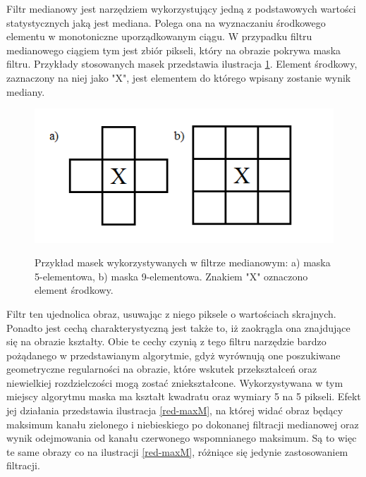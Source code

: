 Filtr medianowy jest narzędziem wykorzystujący jedną z podstawowych wartości statystycznych jaką jest mediana. Polega ona na wyznaczaniu środkowego elementu w monotoniczne uporządkowanym ciągu\cite{Malina}. W przypadku filtru medianowego ciągiem tym jest zbiór pikseli, który na obrazie pokrywa maska filtru. Przykłady stosowanych masek przedstawia ilustracja \ref{maski}. Element środkowy, zaznaczony na niej jako "X", jest elementem do którego wpisany zostanie wynik mediany.
\begin{figure}[H]
\begin{center}
\includegraphics[scale=0.8]{imgs/maski.png}
\caption[Przykład masek filtru medianowego.]\small{Przykład masek wykorzystywanych w filtrze medianowym: a) maska 5-elementowa, b) maska 9-elementowa. Znakiem "X" oznaczono element środkowy.}
\label{maski}
\end{center}
\end{figure}
Filtr ten ujednolica obraz, usuwając z niego piksele o wartościach skrajnych. Ponadto jest cechą charakterystyczną jest także to, iż zaokrągla ona znajdujące się na obrazie kształty. Obie te cechy czynią z tego filtru narzędzie bardzo pożądanego w przedstawianym algorytmie, gdyż wyrównują one poszukiwane geometryczne regularności na obrazie, które wskutek przekształceń oraz niewielkiej rozdzielczości mogą zostać zniekształcone. Wykorzystywana w tym miejscy algorytmu maska ma kształt kwadratu oraz wymiary 5 na 5 pikseli. Efekt jej działania przedstawia ilustracja \ref{red-maxM}, na której widać obraz będący maksimum kanału zielonego i niebieskiego po dokonanej filtracji medianowej oraz wynik odejmowania od kanału czerwonego wspomnianego maksimum. Są to więc te same obrazy co na ilustracji \ref{red-maxM}, różniące się jedynie zastosowaniem filtracji.
